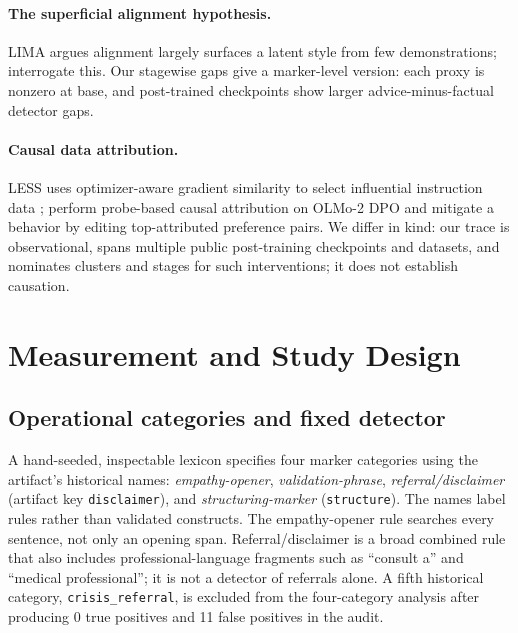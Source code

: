 \documentclass[11pt]{article}
\begin{document}
\paragraph{The superficial alignment hypothesis.}
LIMA \citep{zhou2023lima} argues alignment largely surfaces a latent style
from few demonstrations; \citet{ghosh2024closer} interrogate this. Our
stagewise gaps give a marker-level version: each proxy is nonzero at base,
and post-trained checkpoints show larger advice-minus-factual detector gaps.

\paragraph{Causal data attribution.}
LESS uses optimizer-aware gradient similarity to select influential instruction
data \citep{xia2024less}; \citet{xiao2026probe} perform probe-based causal
attribution on OLMo-2 DPO and mitigate a behavior by editing top-attributed
preference pairs. We differ in kind: our trace is observational, spans multiple
public post-training checkpoints and datasets, and nominates clusters and stages
for such interventions; it does not establish causation.

\section{Measurement and Study Design}

\subsection{Operational categories and fixed detector}
\label{sec:method-detect}
A hand-seeded, inspectable lexicon specifies four marker categories using the
artifact's historical names: \emph{empathy-opener}, \emph{validation-phrase},
\emph{referral/disclaimer} (artifact key \texttt{disclaimer}), and
\emph{structuring-marker} (\texttt{structure}). The names label rules rather
than validated constructs. The empathy-opener rule searches every sentence, not
only an opening span. Referral/disclaimer is a broad combined rule that also
includes professional-language fragments such as ``consult a'' and ``medical
professional''; it is not a detector of referrals alone. A fifth historical
category, \texttt{crisis\_referral}, is excluded from the four-category analysis
after producing 0 true positives and 11 false positives in the audit.
\end{document}
